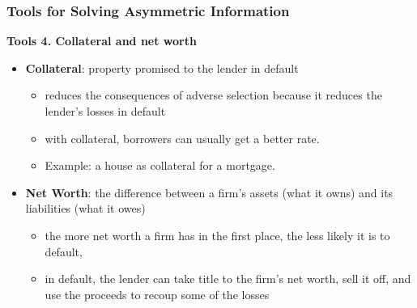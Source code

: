 \documentclass[aspectratio=169]{beamer}
\begin{document}
\begin{frame}
\frametitle{Tools for Solving Asymmetric Information}



\textbf{Tools 4. Collateral and net worth}
\begin{itemize}
    \item \textbf{Collateral}: property promised to the lender in default
    \begin{itemize}
        \item reduces the consequences of adverse selection because it reduces the lender’s losses in default
        \item with collateral, borrowers can usually get a better rate. 
        \item Example: a house as collateral for a mortgage.
    \end{itemize}
    \medskip 
    \item \textbf{Net Worth}: the difference between a firm’s assets (what it owns) and its liabilities (what it owes)
    \begin{itemize}
        \item the more net worth a firm has in the first place, the less likely it is to default,
        \item in default, the lender can take title to the firm’s net worth, sell it off, and use the proceeds to recoup some of the losses
    \end{itemize}
\end{itemize}


\end{frame}
\end{document}
